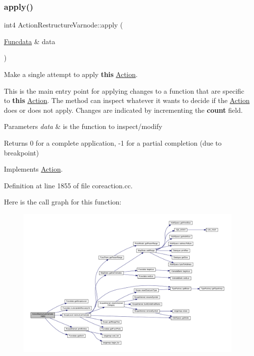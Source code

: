 \subsubsection{\texorpdfstring{apply()}{apply()}}
{\footnotesize\ttfamily int4 Action\+Restructure\+Varnode\+::apply (\begin{DoxyParamCaption}\item[{\mbox{\hyperlink{class_funcdata}{Funcdata}} \&}]{data }\end{DoxyParamCaption})\hspace{0.3cm}{\ttfamily [virtual]}}



Make a single attempt to apply {\bfseries{this}} \mbox{\hyperlink{class_action}{Action}}. 

This is the main entry point for applying changes to a function that are specific to {\bfseries{this}} \mbox{\hyperlink{class_action}{Action}}. The method can inspect whatever it wants to decide if the \mbox{\hyperlink{class_action}{Action}} does or does not apply. Changes are indicated by incrementing the {\bfseries{count}} field. 
\begin{DoxyParams}{Parameters}
{\em data} & is the function to inspect/modify \\
\hline
\end{DoxyParams}
\begin{DoxyReturn}{Returns}
0 for a complete application, -\/1 for a partial completion (due to breakpoint) 
\end{DoxyReturn}


Implements \mbox{\hyperlink{class_action_aac1c3999d6c685b15f5d9765a4d04173}{Action}}.



Definition at line 1855 of file coreaction.\+cc.

Here is the call graph for this function\+:
\nopagebreak
\begin{figure}[H]
\begin{center}
\leavevmode
\includegraphics[width=350pt]{class_action_restructure_varnode_ae2fc4e8dada82bfc532f072aebeb1a73_cgraph}
\end{center}
\end{figure}
\mbox{\label{class_action_restructure_varnode_ad29015bf18989dac6349662f96aa469f}} 
